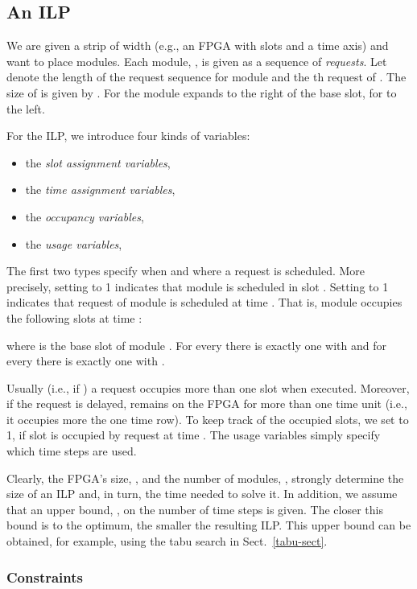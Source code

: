 \documentclass[10pt,journal]{IEEEtran}
\begin{document}
\subsection{An ILP}
We are given a strip of width  
(e.g., an FPGA with  slots and a time axis) and
want to place  modules.
Each module, , is given as a sequence
of {\em requests}.
Let  denote the length of the request sequence for module  and
 the th request of . The size of  is given by
. 
For  the module expands to the right of the base slot, 
for  to the left.

\smallskip\noindent
For the ILP, we introduce four kinds of variables:
\begin{itemize}
\item the {\em slot assignment variables}, 
\item the {\em time assignment variables}, 
\item the {\em occupancy variables}, 
\item the {\em usage variables}, 
\end{itemize}

The first two types specify when and where a request
is scheduled. More precisely, setting  to 1 indicates 
that module  is scheduled in slot . 
Setting  to 1 indicates that 
request  of module  is scheduled at time . That is,
module  occupies the following slots at time :



\noindent
where  is the base slot of module . 
For every 
 there is exactly one  with  and
for every 
 there is exactly one  with .

Usually (i.e., if ) a request occupies more than one slot when
executed. Moreover, if the request  is delayed,  
remains on the FPGA for more than one time unit
(i.e., it occupies more the one time row).
To keep track of the occupied slots, we set  to 1, if 
slot  is occupied by request  at time .
The usage variables simply specify which
time steps are used. 

Clearly, the FPGA's size, , and the number of modules, , 
strongly determine the size of an ILP and, in turn, the time needed to solve it.
In addition, we assume that an upper bound, , on the number of time steps
is given. The closer this bound is to the optimum, the smaller the 
resulting ILP. This upper bound can be obtained, for example, using
the tabu search in Sect.~\ref{tabu-sect}.\\

\subsubsection{Constraints}
\end{document}

